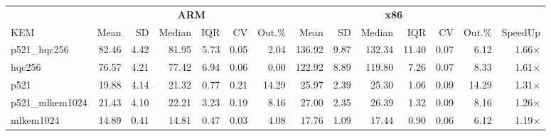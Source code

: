 \begin{table}[!ht]
\centering
\begin{tabular}{l|rrrrrr|rrrrrr|r}
\toprule
& \multicolumn{6}{c}{\bfseries ARM} & \multicolumn{6}{c}{\bfseries x86} & \\
\cmidrule(lr){2-7} \cmidrule(lr){8-13}
KEM & Mean & SD & Median & IQR & CV & Out.\% & Mean & SD & Median & IQR & CV & Out.\% & SpeedUp \\
\midrule
p521_hqc256 & 82.46 & 4.42 & 81.95 & 5.73 & 0.05 & 2.04 & 136.92 & 9.87 & 132.34 & 11.40 & 0.07 & 6.12 & 1.66× \\
hqc256 & 76.57 & 4.21 & 77.42 & 6.94 & 0.06 & 0.00 & 122.92 & 8.89 & 119.80 & 7.26 & 0.07 & 8.33 & 1.61× \\
p521 & 19.88 & 4.14 & 21.32 & 0.77 & 0.21 & 14.29 & 25.97 & 2.39 & 25.30 & 1.06 & 0.09 & 14.29 & 1.31× \\
p521_mlkem1024 & 21.43 & 4.10 & 22.21 & 3.23 & 0.19 & 8.16 & 27.00 & 2.35 & 26.39 & 1.32 & 0.09 & 8.16 & 1.26× \\
mlkem1024 & 14.89 & 0.41 & 14.81 & 0.47 & 0.03 & 4.08 & 17.76 & 1.09 & 17.44 & 0.90 & 0.06 & 6.12 & 1.19× \\
\bottomrule
\end{tabular}
\end{table}
